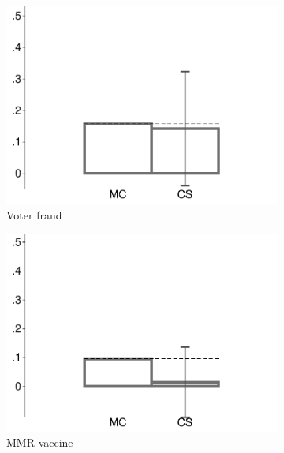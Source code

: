 \begin{figure}[t]
\begin{subfigure}{.325\textwidth}
		\includegraphics[width=\textwidth]{../figs/confidence_score_ccd_imc_14k_fraud_study1.pdf}
		\caption{Voter fraud}
	\end{subfigure}
	\hfill
	\begin{subfigure}{.325\textwidth}\centering
		\includegraphics[width=\textwidth]{../figs/confidence_score_ccd_imc_14k_mmr_study1.pdf}
		\caption{MMR vaccine}
	\end{subfigure}	
	\hfill
	\begin{subfigure}{.325\textwidth}\centering

\end{subfigure}
\end{figure}
